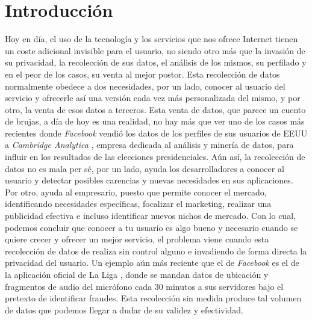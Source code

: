 \documentclass[12pt,a4paper,oneside]{book} %
\begin{document}
\chapter{Introducción}
Hoy en día, el uso de la tecnología y los servicios que nos ofrece Internet tienen un coste adicional invisible para el usuario, no siendo otro más que la invasión de su privacidad, la recolección de sus datos, el análisis de los mismos, su perfilado y en el peor de los casos, su venta al mejor postor. 
\newline \newline
Esta recolección de datos normalmente  obedece a dos necesidades, por un lado, conocer al usuario del servicio y ofrecerle así una versión cada vez más personalizada del mismo, y por otro, la venta de esos datos a terceros. 
\newline \newline
Esta venta de datos, que parece un cuento de brujas, a día de hoy es una realidad, no hay más que ver uno de los casos más recientes donde \textit{Facebook} vendió los datos de los perfiles de sus usuarios de EEUU a \textit{Cambridge Analytica} \cite{fbCambridge}, empresa dedicada al análisis y minería de datos, para influir en los resultados de las elecciones presidenciales. 
\newline \newline
Aún así, la recolección de datos no es mala per sé, por un lado, ayuda los desarrolladores a conocer al usuario y detectar posibles carencias y nuevas necesidades en sus aplicaciones. Por otro, ayuda al empresario, puesto que permite conocer el mercado, identificando necesidades específicas, focalizar el marketing, realizar una publicidad efectiva e incluso identificar nuevos nichos de mercado. 
\newline \newline
Con lo cual, podemos concluir que conocer a tu usuario es algo bueno y necesario cuando se quiere crecer y ofrecer un mejor servicio, el problema viene cuando esta recolección de datos de realiza sin control alguno e invadiendo de forma directa la privacidad del usuario. Un ejemplo aún más reciente que el de \textit{Facebook} es el de la aplicación oficial de La Liga \cite{LaLiga}, donde se mandan datos de ubicación y fragmentos de audio del micrófono cada 30 minutos a sus servidores bajo el pretexto de identificar fraudes. Esta recolección sin medida produce tal volumen de datos que podemos llegar a dudar de su validez y efectividad. 
\newline \newline
\end{document}
